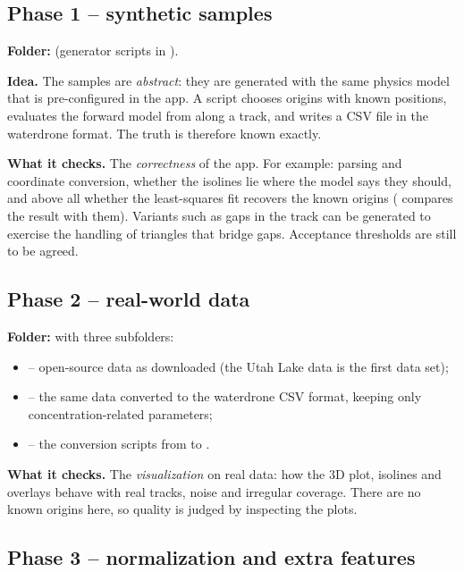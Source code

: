 \documentclass{article}
\begin{document}
\subsection{Phase 1 -- synthetic samples}

\textbf{Folder:}  (generator scripts in
).

\textbf{Idea.} The samples are \emph{abstract}: they are generated with the
same physics model that is pre-configured in the app. A script chooses origins
with known positions, evaluates the forward model from
 along a track, and writes a CSV file in the
waterdrone format. The truth is therefore known exactly.

\textbf{What it checks.} The \emph{correctness} of the app. For example:
parsing and coordinate conversion, whether the isolines lie where the model
says they should, and above all whether the least-squares fit recovers the
known origins ( compares the result with them).
Variants such as gaps in the track can be generated to exercise the handling
of triangles that bridge gaps. Acceptance thresholds are still to be agreed.

\subsection{Phase 2 -- real-world data}

\textbf{Folder:}  with three subfolders:

\begin{itemize}
\item {} -- open-source data as downloaded (the Utah Lake data is the
      first data set);
\item {} -- the same data converted to the waterdrone CSV format,
      keeping only concentration-related parameters;
\item {} -- the conversion scripts from  to
      .
\end{itemize}

\textbf{What it checks.} The \emph{visualization} on real data: how the 3D plot,
isolines and overlays behave with real tracks, noise and irregular coverage.
There are no known origins here, so quality is judged by inspecting the plots.

\subsection{Phase 3 -- normalization and extra features}
\end{document}
